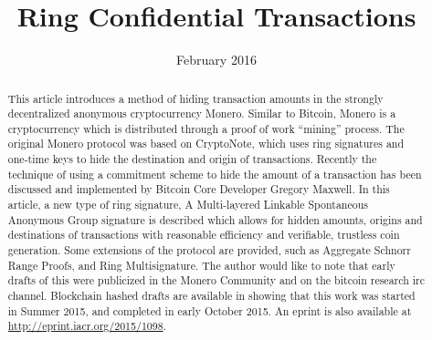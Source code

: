 \documentclass[12pt,english]{mrl}
\theoremstyle{definition}
\numberwithin{equation}{section}
\numberwithin{figure}{section}
\numberwithin{equation}{section}
\numberwithin{equation}{section}
\numberwithin{figure}{section}
\begin{document}
\begin{frontmatter}

\begin{fmbox}
\hfill\setlength{\fboxrule}{0px}\setlength{\fboxsep}{5px}
\title{Ring Confidential Transactions}
\date{February 2016}
\author[
   addressref={mrl},
   email={lab@getmonero.org   shen.noether@gmx.com}
]{ }
\author[
   addressref={mrl},
   email={lab@getmonero.org}
]{ }
\author[
   addressref={mrl},
   email={lab@getmonero.org}
]{}

\address[id=mrl]{
}\end{fmbox}


\begin{abstractbox}
\begin{abstract}
This article introduces a method of hiding transaction amounts in
the strongly decentralized anonymous cryptocurrency Monero. Similar
to Bitcoin, Monero is a cryptocurrency which is distributed through
a proof of work ``mining'' process. The original Monero protocol
was based on CryptoNote, which uses ring signatures and one-time keys
to hide the destination and origin of transactions. Recently the technique
of using a commitment scheme to hide the amount of a transaction has
been discussed and implemented by Bitcoin Core Developer Gregory Maxwell.
In this article, a new type of ring signature, A Multi-layered Linkable
Spontaneous Anonymous Group signature is described which allows for hidden
amounts, origins and destinations of transactions with reasonable
efficiency and verifiable, trustless coin generation. Some extensions of the protocol are provided, such as Aggregate Schnorr Range Proofs, and Ring Multisignature. The author would like to note that early drafts of this were publicized in the Monero Community and on the bitcoin research irc channel. Blockchain hashed drafts are available in \cite{Snoe} showing that this work was started in Summer 2015, and completed in early October 2015. An eprint is also available at \url{http://eprint.iacr.org/2015/1098}.
\end{abstract}
\end{abstractbox}

\end{frontmatter}
\end{document}
